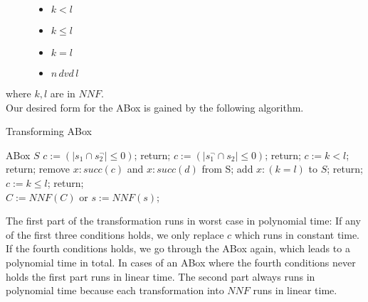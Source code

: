 \documentclass[a4paper,11pt]{scrartcl}
\theoremstyle{break}
\theoremstyle{definition}
\begin{document}
\begin{figure}[H]
\begin{minipage}[t]{.5\textwidth}
\raggedright
\begin{itemize}
\item $k<l$
\item $k\leq l$
\end{itemize}
\end{minipage}%
\begin{minipage}[t]{.5\textwidth}
\raggedleft
\begin{itemize}
\item $k=l$
\item $n\,dvd\, l$
\end{itemize}
\end{minipage}
\end{figure}
where $k,l$ are in $NNF$.\\
Our desired form for the ABox is gained by the following algorithm.
\begin{algorithm}[H] \caption{Transforming ABox}
\begin{algorithmic}[l]
\State ABox $S$
\State $c:=(|s_1\cap s_2^\neg|\leq 0)$; return;
\EndIf
{}
\State $c:=(|s_1^\neg\cap s_2|\leq 0)$; return;
\EndIf
{}
\State $c:=k< l$; return;
\EndIf
{}
\State remove $x:succ(c)$ and $x:succ(d)$ from S;
\State add $x:(k=l)$ to $S$; return;
\Else
\State $c:=k\leq l$; return;
\EndIf
\EndFor
\EndIf
\EndFor\\
\State $C:=NNF(C)$ or $s:=NNF(s)$;
\EndFor
\end{algorithmic}
\end{algorithm}
The first part of the transformation runs in worst case in polynomial time: If any of the first three conditions holds, we only replace $c$ which runs in constant time. If the fourth conditions holds, we go through the ABox again, which leads to a polynomial time in total. In cases of an ABox where the fourth conditions never holds the first part runs in linear time. The second part always runs in polynomial time because each transformation into $NNF$ runs in linear time.
\end{document}
